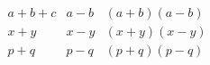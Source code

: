 \documentclass{article}
\begin{document}
\begin{align*}
a+b + c        &     a-b              &  (a+b)(a-b)\\
x+y         &  x-y   &  (x+y)(x-y)\\
p+q   &  p-q          &  (p+q)(p-q)
\end{align*}
\end{document}

